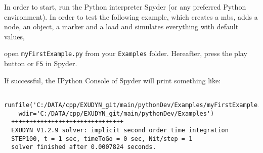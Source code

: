 In order to start, run the Python interpreter Spyder (or any preferred Python environment).
In order to test the following example, which creates a \ac{mbs}, adds a node, an object, a marker and a load and simulates everything with default values, 
\bi
{}
\item open \texttt{myFirstExample.py} from your \texttt{Examples} folder.
\ei
Hereafter, press the play button or \texttt{F5} in Spyder.
%

If successful, the IPython Console of Spyder will print something like:
\begin{lstlisting}
  runfile('C:/DATA/cpp/EXUDYN_git/main/pythonDev/Examples/myFirstExample.py', 
    wdir='C:/DATA/cpp/EXUDYN_git/main/pythonDev/Examples')
  +++++++++++++++++++++++++++++++
  EXUDYN V1.2.9 solver: implicit second order time integration
  STEP100, t = 1 sec, timeToGo = 0 sec, Nit/step = 1
  solver finished after 0.0007824 seconds.
\end{lstlisting}

